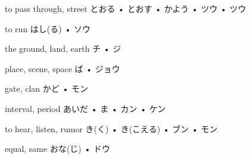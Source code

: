 



\setcounter{cardnum}{49}

		{to pass through, street}
		{とおる • とおす • かよう • ツウ • ツウ}
		{}{}
		{}{}
		{}{}
		{}{}
		{}{}

		{to run}
		{はし(る) • ソウ}
		{}{}
		{}{}
		{}{}
		{}{}
		{}{}

		{the ground, land, earth}
		{チ • ジ}
		{}{}
		{}{}
		{}{}
		{}{}
		{}{}

		{place, scene, space}
		{ば • ジョウ}
		{}{}
		{}{}
		{}{}
		{}{}
		{}{}

		{gate, clan}
		{かど • モン}
		{}{}
		{}{}
		{}{}
		{}{}
		{}{}

		{interval, period}
		{あいだ • ま • カン • ケン}
		{}{}
		{}{}
		{}{}
		{}{}
		{}{}

		{to hear, listen, rumor}
		{き(く) • き(こえる) • ブン • モン}
		{}{}
		{}{}
		{}{}
		{}{}
		{}{}

		{equal, same}
		{おな(じ) • ドウ}
		{}{}
		{}{}
		{}{}
		{}{}
		{}{}

